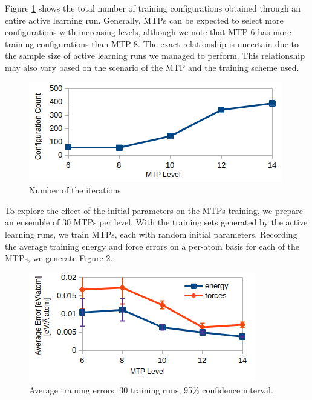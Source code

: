 \documentclass[9pt,twocolumn,twoside]{opticajnl}
\begin{document}
Figure \ref{fig:levels} shows the total number of training configurations obtained through an entire active learning run. Generally, MTPs can be expected to select more configurations with increasing levels, although we note that MTP 6 has more training configurations than MTP 8. The exact relationship is uncertain due to the sample size of active learning runs we managed to perform. This relationship may also vary based on the scenario of the MTP and the training scheme used. 

\begin{figure}[ht]
  \centering
  \includegraphics[width=\linewidth]{assets/levels.png}
  \caption{Number of the iterations }
  \label{fig:levels}
\end{figure}

To explore the effect of the initial parameters on the MTPs training, we prepare an ensemble of 30 MTPs per level. With the training sets generated by the active learning runs, we train MTPs, each with random initial parameters. Recording the average training energy and force errors on a per-atom basis for each of the MTPs, we generate Figure \ref{fig:errors}. 

\begin{figure}[ht]
  \centering
  \includegraphics[width=\linewidth]{assets/errors.png}
  \caption{Average training errors. 30 training runs, 95\% confidence interval.}
  \label{fig:errors}
\end{figure}
\end{document}
